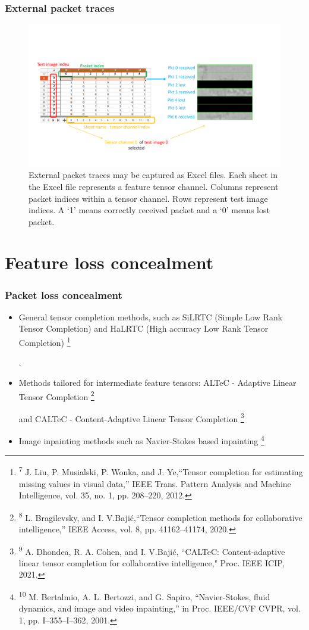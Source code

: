 \documentclass[aspectratio=169]{beamer}
\newcommand\blfootnote[1]{%
	\begingroup
	\renewcommand\thefootnote{}\footnote{#1}%
	\addtocounter{footnote}{-1}%
	\endgroup
}
\begin{document}
\begin{frame}
\frametitle{External packet traces}
       \begin{figure}
        \centering
        \includegraphics[scale=0.4,viewport=20 60 840 400,clip]{externalpkt.pdf}
        \caption{External packet traces may be captured as Excel files. Each sheet in the Excel file represents a feature tensor channel. Columns represent packet indices within a tensor channel. Rows represent test image indices. A `1' means correctly received packet and a `0' means lost packet.}
        \label{fig:extpkt}
    \end{figure}
\end{frame}

\section{Feature loss concealment}
\begin{frame}
	\frametitle{Packet loss concealment}
	\begin{itemize}
		\item General tensor completion methods, such as SiLRTC (Simple Low Rank Tensor Completion) and HaLRTC (High accuracy Low Rank Tensor Completion) \cite{liu2012tensor}\blfootnote{\tiny \textsuperscript{7} J. Liu, P. Musialski, P. Wonka, and J. Ye,``Tensor completion for estimating missing values in visual data,” IEEE Trans. Pattern Analysis and Machine Intelligence, vol. 35, no. 1, pp. 208–220, 2012.}.
		\item Methods tailored for intermediate feature tensors: ALTeC - Adaptive Linear Tensor Completion \cite{Bragile2020} \blfootnote{\tiny \textsuperscript{8} L. Bragilevsky, and I. V.Bajić,``Tensor completion methods for collaborative intelligence,” IEEE Access, vol. 8, pp. 41162–41174, 2020.} and CALTeC - Content-Adaptive Linear Tensor Completion \cite{CALTeC_ICIP_2021} \blfootnote{\tiny \textsuperscript{9} A. Dhondea, R. A. Cohen, and I. V.Bajić, ``CALTeC: Content-adaptive linear tensor completion for collaborative intelligence," Proc. IEEE ICIP, 2021.}
		\item Image inpainting methods such as Navier-Stokes based inpainting \cite{navierstokes} \blfootnote{\tiny \textsuperscript{10} M. Bertalmio, A. L. Bertozzi, and G. Sapiro, ``Navier-Stokes, fluid dynamics, and image and video inpainting,” in Proc. IEEE/CVF CVPR, vol. 1, pp. I–355–I–362, 2001.}
	\end{itemize}
\end{frame}
\end{document}
